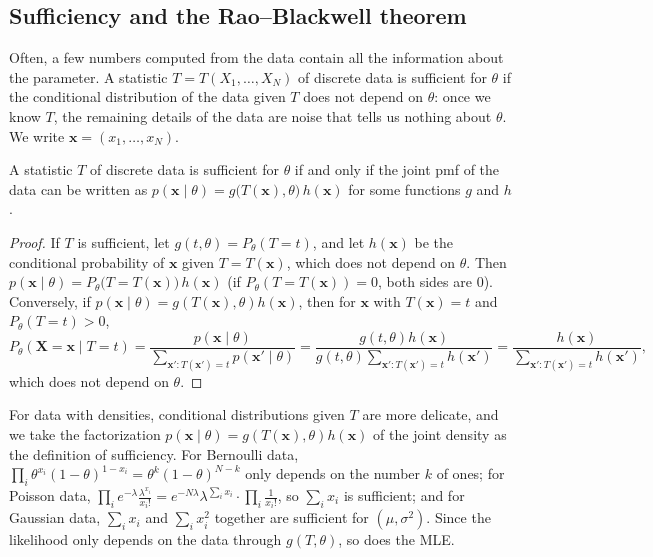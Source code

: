 \subsection{Sufficiency and the Rao--Blackwell theorem}

Often, a few numbers computed from the data contain all the information about the parameter. A statistic $T = T(X_1, \ldots, X_N)$ of discrete data is sufficient for $\theta$ if the conditional distribution of the data given $T$ does not depend on $\theta$: once we know $T$, the remaining details of the data are noise that tells us nothing about $\theta$. We write $\mathbf{x} = (x_1, \ldots, x_N)$.

\begin{theorem}\label{L4-thm:factorization}
    A statistic $T$ of discrete data is sufficient for $\theta$ if and only if the joint pmf of the data can be written as $p(\mathbf{x} \mid \theta) = g\big(T(\mathbf{x}), \theta\big)\,h(\mathbf{x})$ for some functions $g$ and $h$.
\end{theorem}

\begin{proof}
    If $T$ is sufficient, let $g(t, \theta) = P_\theta(T = t)$, and let $h(\mathbf{x})$ be the conditional probability of $\mathbf{x}$ given $T = T(\mathbf{x})$, which does not depend on $\theta$. Then $p(\mathbf{x} \mid \theta) = P_\theta\big(T = T(\mathbf{x})\big)\,h(\mathbf{x})$ (if $P_\theta(T = T(\mathbf{x})) = 0$, both sides are $0$). Conversely, if $p(\mathbf{x} \mid \theta) = g(T(\mathbf{x}), \theta)h(\mathbf{x})$, then for $\mathbf{x}$ with $T(\mathbf{x}) = t$ and $P_\theta(T = t) > 0$,
    \[P_\theta(\mathbf{X} = \mathbf{x} \mid T = t) = \frac{p(\mathbf{x} \mid \theta)}{\sum_{\mathbf{x}' : T(\mathbf{x}') = t} p(\mathbf{x}' \mid \theta)} = \frac{g(t, \theta)h(\mathbf{x})}{g(t, \theta)\sum_{\mathbf{x}' : T(\mathbf{x}') = t} h(\mathbf{x}')} = \frac{h(\mathbf{x})}{\sum_{\mathbf{x}' : T(\mathbf{x}') = t} h(\mathbf{x}')},\]
    which does not depend on $\theta$.
\end{proof}

For data with densities, conditional distributions given $T$ are more delicate, and we take the factorization $p(\mathbf{x} \mid \theta) = g(T(\mathbf{x}), \theta)h(\mathbf{x})$ of the joint density as the definition of sufficiency. For Bernoulli data, $\prod_i \theta^{x_i}(1 - \theta)^{1 - x_i} = \theta^k(1 - \theta)^{N - k}$ only depends on the number $k$ of ones; for Poisson data, $\prod_i e^{-\lambda}\frac{\lambda^{x_i}}{x_i!} = e^{-N\lambda}\lambda^{\sum_i x_i} \cdot \prod_i \frac{1}{x_i!}$, so $\sum_i x_i$ is sufficient; and for Gaussian data, $\sum_i x_i$ and $\sum_i x_i^2$ together are sufficient for $(\mu, \sigma^2)$. Since the likelihood only depends on the data through $g(T, \theta)$, so does the MLE.

